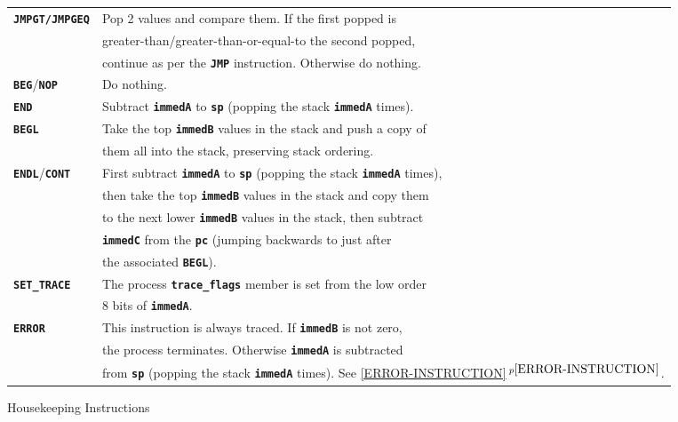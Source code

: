 \documentclass[12pt]{article}
\newcommand{\TT}[1]{{\tt \bfseries #1}}
\newcommand{\itemref}[1]{\ref{#1}$\,^{p\pageref{#1}}$}
\newlength{\figurewidth}
\newenvironment{boxedfigure}[1][!btp]%
	{\begin{figure*}[#1]
	 \begin{lrbox}{\figurebox}
	 \begin{minipage}{\figurewidth}

	 \vspace*{1ex}}%
	{
	 \vspace*{1ex}

	 \end{minipage}
	 \end{lrbox}

	 \centering
	 \fbox{\hspace*{0.1in}\usebox{\figurebox}\hspace*{0.1in}}
	 \end{figure*}}
\begin{document}
\begin{boxedfigure}
\begin{center}
\begin{tabular}{|l|l|}
\\\hline
\TT{JMPGT/JMPGEQ}
    & Pop 2 values and compare them.  If the first popped is \\
    & greater-than/greater-than-or-equal-to the second popped, \\
    & continue as per the \TT{JMP} instruction.  Otherwise do nothing.
\\\hline
\TT{BEG}/\TT{NOP}
    & Do nothing.
\\\hline
\TT{END}
    & Subtract \TT{immedA} to \TT{sp} (popping the stack \TT{immedA} times).
\\\hline
\TT{BEGL}
    & Take the top \TT{immedB} values in the stack and push a copy of \\
    & them all into the stack, preserving stack ordering.
\\\hline
\TT{ENDL}/\TT{CONT}
    & First subtract \TT{immedA} to \TT{sp}
      (popping the stack \TT{immedA} times), \\
    & then take the top \TT{immedB} values in the stack and copy them \\
    & to the next lower \TT{immedB} values in the stack, then subtract \\
    & \TT{immedC} from the \TT{pc} (jumping backwards to just after \\
    & the associated \TT{BEGL}).
\\\hline
\TT{SET\_TRACE}
    & The process \TT{trace\_flags} member is set from the low order \\
    & 8 bits of \TT{immedA}.
\\\hline
\TT{ERROR}
    & This instruction is always traced.  If \TT{immedB} is not zero, \\
    & the process terminates.
      Otherwise \TT{immedA} is subtracted \\
    & from \TT{sp} (popping the stack \TT{immedA} times).
      See \itemref{ERROR-INSTRUCTION}.
\\\hline
\end{tabular}
\end{center}
\vspace*{-3ex}
\caption{Housekeeping Instructions}
\label{HOUSEKEEPING-INSTRUCTIONS}
\end{boxedfigure}
\end{document}
